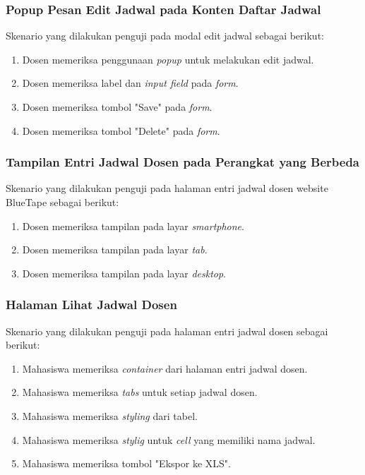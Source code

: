 \subsubsection{Popup Pesan Edit Jadwal pada Konten Daftar Jadwal}
Skenario yang dilakukan penguji pada modal edit jadwal sebagai berikut:
\begin{enumerate}
	\item Dosen memeriksa penggunaan \textit{popup} untuk melakukan edit jadwal.
	\item Dosen memeriksa label dan \textit{input field} pada \textit{form}. 
	\item Dosen memeriksa tombol "Save" pada \textit{form}.
	\item Dosen memeriksa tombol "Delete" pada \textit{form}.
\end{enumerate}

\subsubsection{Tampilan Entri Jadwal Dosen pada Perangkat yang Berbeda}
Skenario yang dilakukan penguji pada halaman entri jadwal dosen website BlueTape sebagai berikut:
\begin{enumerate}
	\item Dosen memeriksa tampilan pada layar \textit{smartphone}. 	
	\item Dosen memeriksa tampilan pada layar \textit{tab}.
	\item Dosen memeriksa tampilan pada layar \textit{desktop}.
\end{enumerate}

\subsubsection{Halaman Lihat Jadwal Dosen}
Skenario yang dilakukan penguji pada halaman entri jadwal dosen sebagai berikut:
\begin{enumerate}
	\item Mahasiswa memeriksa \textit{container} dari halaman entri jadwal dosen.
	\item Mahasiswa memeriksa \textit{tabs} untuk setiap jadwal dosen.
	\item Mahasiswa memeriksa \textit{styling} dari tabel.	
	\item Mahasiswa memeriksa \textit{stylig} untuk \textit{cell} yang memiliki nama jadwal.
	\item Mahasiswa memeriksa tombol "Ekspor ke XLS".
\end{enumerate}

